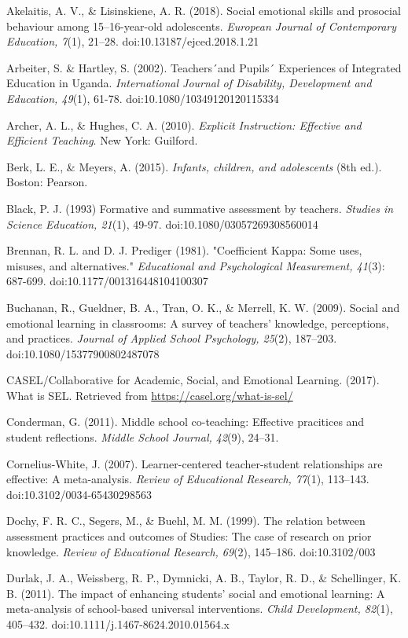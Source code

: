 \documentclass[11.5pt]{sig-alternate} %
\begin{document}
\leftskip 0.25in
\parindent -0.25in 
Akelaitis, A. V., \& Lisinskiene, A. R. (2018). Social emotional skills and prosocial behaviour among 15–16-year-old adolescents. \textit{European Journal of Contemporary Education, 7}(1), 21–28. doi:10.13187/ejced.2018.1.21

Arbeiter, S. \& Hartley, S. (2002). Teachers´and Pupils´ Experiences of Integrated Education in Uganda. \textit{International Journal of Disability, Development and Education, 49}(1), 61-78. doi:10.1080/10349120120115334

Archer, A. L., \& Hughes, C. A. (2010). \textit{Explicit Instruction: Effective and Efficient Teaching}. New York: Guilford.

Berk, L. E., \& Meyers, A. (2015). \textit{Infants, children, and adolescents} (8th ed.). Boston: Pearson.

Black, P. J. (1993) Formative and summative assessment by teachers. \textit{Studies in Science Education, 21}(1), 49-97. doi:10.1080/03057269308560014

Brennan, R. L. and D. J. Prediger (1981). "Coefficient Kappa: Some uses, misuses, and alternatives." \textit{Educational and Psychological Measurement, 41}(3): 687-699. doi:10.1177/001316448104100307

Buchanan, R., Gueldner, B. A., Tran, O. K., \& Merrell, K. W. (2009). Social and emotional learning in classrooms: A survey of teachers’ knowledge, perceptions, and practices. \textit{Journal of Applied School Psychology, 25}(2), 187–203. doi:10.1080/15377900802487078

CASEL/Collaborative for Academic, Social, and Emotional Learning. (2017). What is SEL. Retrieved from \url{https://casel.org/what-is-sel/}

Conderman, G. (2011). Middle school co-teaching: Effective pracitices and student reflections. \textit{Middle School Journal, 42}(9), 24–31.

Cornelius-White, J. (2007). Learner-centered teacher-student relationships are effective: A meta-analysis. \textit{Review of Educational Research, 77}(1), 113–143. doi:10.3102/0034-65430298563

Dochy, F. R. C., Segers, M., \& Buehl, M. M. (1999). The relation between assessment practices and outcomes of Studies: The case of research on prior knowledge. \textit{Review of Educational Research, 69}(2), 145–186. doi:10.3102/003

Durlak, J. A., Weissberg, R. P., Dymnicki, A. B., Taylor, R. D., \& Schellinger, K. B. (2011). The impact of enhancing students’ social and emotional learning: A meta-analysis of school-based universal interventions. \textit{Child Development, 82}(1), 405–432. doi:10.1111/j.1467-8624.2010.01564.x
\end{document}
